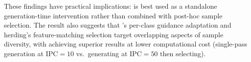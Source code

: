 These findings have practical implications: \cags{} is best used as a standalone generation-time intervention rather than combined with post-hoc sample selection. The result also suggests that \cags{}'s per-class guidance adaptation and herding's feature-matching selection target overlapping aspects of sample diversity, with \cags{} achieving superior results at lower computational cost (single-pass generation at IPC$=10$ vs.\ generating at IPC$=50$ then selecting).
